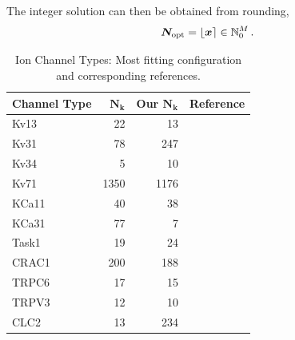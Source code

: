 The integer solution can then be obtained from rounding,
$${\bm{N}}_{\rm opt} = \lfloor {\bm{x}} \rceil \in \mathbb{N}_0^M\,.$$

\begin{table}
  \caption{Ion Channel Types: Most fitting configuration and corresponding references.}
  \begin{tabular}{lrrl}
    \textbf{Channel Type} & \textbf{$\bm{N_k}$ \cite{2021-A549-model}} & \textbf{Our $\bm{N_k}$} & \textbf{Reference}            \\
    \midrule
    Kv13                  & 22                                         & 13                      & \cite{1998-potassium-channel} \\
    Kv31                  & 78                                         & 247                     & \cite{1998-potassium-channel} \\
    Kv34                  & 5                                          & 10                      & \cite{1998-potassium-channel} \\
    Kv71                  & 1350                                       & 1176                    & \cite{1998-potassium-channel} \\
    KCa11                 & 40                                         & 38                      & \cite{1998-potassium-channel} \\
    KCa31                 & 77                                         & 7                       & \cite{1998-potassium-channel} \\
    Task1                 & 19                                         & 24                      & \cite{1998-potassium-channel} \\
    CRAC1                 & 200                                        & 188                     & \cite{1998-potassium-channel} \\
    TRPC6                 & 17                                         & 15                      & \cite{1998-potassium-channel} \\
    TRPV3                 & 12                                         & 10                      & \cite{1998-potassium-channel} \\
    CLC2                  & 13                                         & 234                     & \cite{1998-potassium-channel} \\
  \end{tabular}
  \label{table:channel-types}
\end{table}

